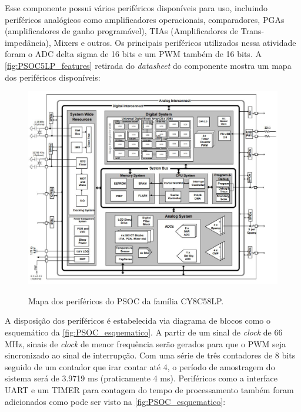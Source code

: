 \documentclass[
	article,			%
	11pt,				%
	oneside,			%
	a4paper,			%
	english,			%
	brazil,				%
	sumario=tradicional
	]{abntex2}
\begin{document}
Esse componente possui vários periféricos disponíveis para uso, incluindo periféricos analógicos como amplificadores operacionais, comparadores, PGAs (amplificadores de ganho programável), TIAs (Amplificadores de Trans-impedância), Mixers e outros. Os principais periféricos utilizados nessa atividade foram o ADC delta sigma de 16 bits e um PWM também de 16 bits.
A \autoref{fig:PSOC5LP_features} retirada do \textit{datasheet} do componente mostra um mapa dos periféricos disponíveis:
\begin{figure}[htb!]
	\centering
	\caption{Mapa dos periféricos do PSOC da família CY8C58LP.}
	\includegraphics[scale=0.55]{./img/PSOC5LP_features.JPG}
	\label{fig:PSOC5LP_features}
\end{figure}

\pagebreak

A disposição dos periféricos é estabelecida via diagrama de blocos como o esquemático da \autoref{fig:PSOC_esquematico}.
A partir de um sinal de \textit{clock} de 66 MHz, sinais de \textit{clock} de menor frequência serão gerados para que o PWM seja sincronizado ao sinal de interrupção. Com uma série de três contadores de 8 bits seguido de um contador que irar contar até 4, o período de amostragem do sistema será de 3.9719 ms (praticamente 4 ms). 
Periféricos como a interface UART e um TIMER para contagem do tempo de processamento também foram adicionados como pode ser visto na \autoref{fig:PSOC_esquematico}:
\end{document}
